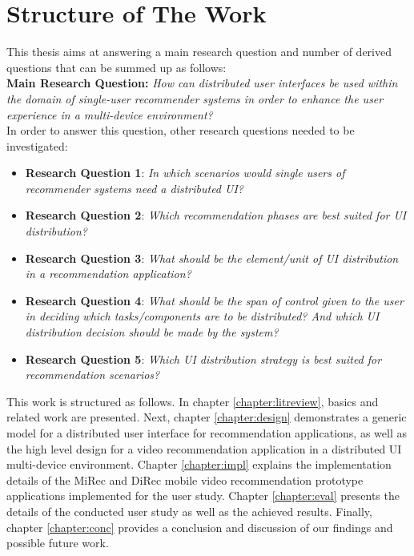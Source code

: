 \section{Structure of The Work}
This thesis aims at answering a main research question and number of derived
questions that can be summed up as follows:\\
\textbf{Main Research Question:} \textit{How can distributed user interfaces be
used within the domain of single-user recommender systems in order to enhance
the user experience in a multi-device environment? }\\
In order to answer this question, other research questions needed to be
investigated:
\begin{itemize}
\item \textbf{Research Question 1}: \textit{In which scenarios would single
users of recommender systems need a distributed UI?}
\item \textbf{Research Question 2}: \textit{Which recommendation phases are best
suited for UI distribution?}
\item \textbf{Research Question 3}: \textit{What should be the element/unit of
UI distribution in a recommendation application?}
\item \textbf{Research Question 4}: \textit{What should be the span of control
given to the user in deciding which tasks/components are to be distributed?
And which UI distribution decision should be made by the system?}
\item \textbf{Research Question 5}: \textit{Which UI distribution strategy is
best suited for recommendation scenarios?}
\end{itemize}

This work is structured as follows. In chapter \ref{chapter:litreview}, basics
and related work are presented. Next, chapter \ref{chapter:design} demonstrates
a generic model for a distributed user interface for recommendation
applications, as well as the high level design for a video recommendation
application in a distributed UI multi-device environment.
Chapter \ref{chapter:impl} explains the implementation details of the MiRec and
DiRec mobile video recommendation prototype applications implemented for the
user study. Chapter \ref{chapter:eval} presents the details of the conducted
user study as well as the achieved results. Finally, chapter \ref{chapter:conc}
provides a conclusion and discussion of our findings and possible future work. 

